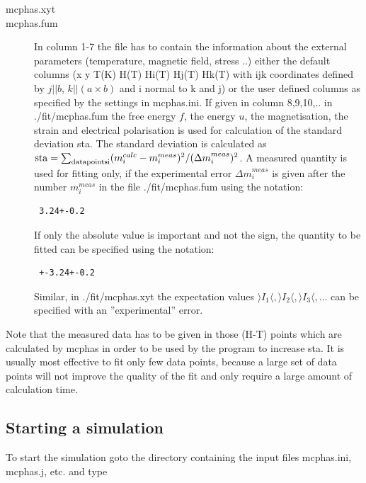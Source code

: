 \begin{description}
\item[{\prg mcphas.xyt}] 
\item[{\prg mcphas.fum}] In column 1-7 the file has to contain the information about the 
            external parameters (temperature, magnetic field, stress ..) either the default columns
            (x y T(K) H(T) Hi(T) Hj(T) Hk(T)  with ijk coordinates 
            defined by  $j||b$, $k||(a \times b)$ and i normal to k and j) or the user defined 
            columns as specified by the settings in {\prg mcphas.ini}.
            If given in column 8,9,10,.. in {\prg ./fit/mcphas.fum } the
            free energy $f$, the energy $u$, the magnetisation, the strain and electrical polarisation
             is used for calculation
	    of the standard deviation sta. The standard deviation is calculated
	    as ${\rm sta}=\sum_{\rm data points i} ({m}_i^{calc}-{m}_i^{meas})^2/({\Delta m}_i^{meas})^2$.
	    A measured quantity is used for fitting only, if the experimental error ${\Delta m}_i^{meas}$ is given
            after the number ${m}_i^{meas}$ in the file {\prg ./fit/mcphas.fum} 
            using the notation: \begin{verbatim} 3.24+-0.2 \end{verbatim}
            If only the absolute value is important and not the sign, the quantity to be fitted can be
            specified using the notation:  \begin{verbatim} +-3.24+-0.2 \end{verbatim}
            Similar, in {\prg  ./fit/mcphas.xyt} the expectation values $\rangle I_1 \langle,\rangle I_2 \langle,\rangle I_3 \langle, \dots $
            can be specified with an ''experimental'' error.
\end{description}

Note that the measured data has to be given in those (H-T) points which are 
calculated by mcphas in order to be used by the program to increase {\prg sta}.
It is usually most effective to fit only few data points, because a large set
of data points will not improve the quality of the fit and only require a large
amount of calculation time.



\subsection{Starting a simulation}
\label{start}

To start the simulation goto the directory containing the
input files {\prg mcphas.ini, mcphas.j, etc. } and type

